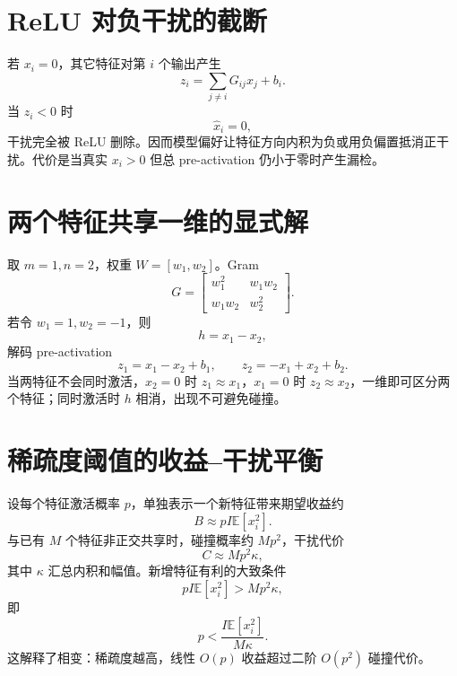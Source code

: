 \documentclass[UTF8,12pt,a4paper,fontset=none]{ctexart}
\numberwithin{equation}{section}
\newcommand{\E}{\mathbb{E}}
\begin{document}
\section{ReLU 对负干扰的截断}
若 $x_i=0$，其它特征对第 $i$ 个输出产生
\begin{equation}
 z_i=\sum_{j\ne i}G_{ij}x_j+b_i.
\end{equation}
当 $z_i<0$ 时
\begin{equation}
 \widehat x_i=0,
\end{equation}
干扰完全被 ReLU 删除。因而模型偏好让特征方向内积为负或用负偏置抵消正干扰。代价是当真实 $x_i>0$ 但总 pre-activation 仍小于零时产生漏检。

\section{两个特征共享一维的显式解}
取 $m=1,n=2$，权重 $W=[w_1,w_2]$。Gram
\begin{equation}
 G=\begin{bmatrix}w_1^2&w_1w_2\\w_1w_2&w_2^2\end{bmatrix}.
\end{equation}
若令 $w_1=1,w_2=-1$，则
\begin{equation}
 h=x_1-x_2,
\end{equation}
解码 pre-activation
\begin{equation}
 z_1=x_1-x_2+b_1,
 \qquad z_2=-x_1+x_2+b_2.
\end{equation}
当两特征不会同时激活，$x_2=0$ 时 $z_1\approx x_1$，$x_1=0$ 时 $z_2\approx x_2$，一维即可区分两个特征；同时激活时 $h$ 相消，出现不可避免碰撞。

\section{稀疏度阈值的收益--干扰平衡}
设每个特征激活概率 $p$，单独表示一个新特征带来期望收益约
\begin{equation}
 B\approx pI\E[x_i^2].
\end{equation}
与已有 $M$ 个特征非正交共享时，碰撞概率约 $Mp^2$，干扰代价
\begin{equation}
 C\approx Mp^2\kappa,
\end{equation}
其中 $\kappa$ 汇总内积和幅值。新增特征有利的大致条件
\begin{equation}
 pI\E[x_i^2]>Mp^2\kappa,
\end{equation}
即
\begin{equation}
 p<\frac{I\E[x_i^2]}{M\kappa}.
\end{equation}
这解释了相变：稀疏度越高，线性 $O(p)$ 收益超过二阶 $O(p^2)$ 碰撞代价。
\end{document}
